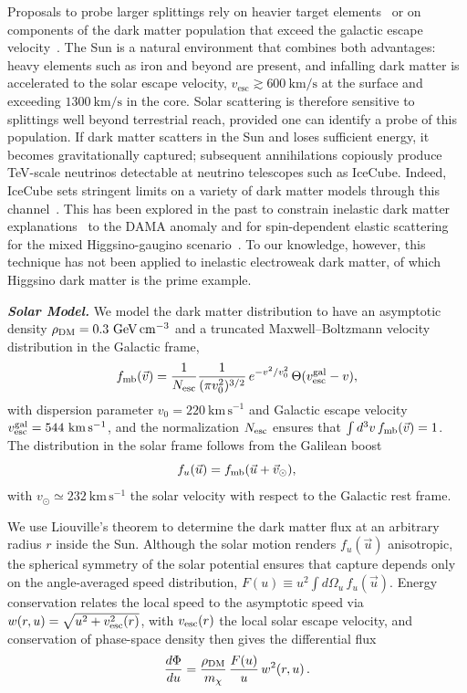 \documentclass[prl,reprint,superscriptaddress]{revtex4-2}
\begin{document}
Proposals to probe larger splittings rely on heavier target elements~\cite{Eby:2019mgs, Graham:2024syw, Graham:2026ivn,Alloni:2026xdf} or on components of the dark matter population that exceed the galactic escape velocity~\cite{Graham:2024syw, Graham:2026ivn}. The Sun is a natural environment that combines both advantages: heavy elements such as iron and beyond are present, and infalling dark matter is accelerated to the solar escape velocity, $v_\mathrm{esc} \gtrsim 600~\mathrm{km/s}$ at the surface and exceeding $1300~\mathrm{km/s}$ in the core. Solar scattering is therefore sensitive to splittings well beyond terrestrial reach, provided one can identify a probe of this population. If dark matter scatters in the Sun and loses sufficient energy, it becomes gravitationally captured; subsequent annihilations copiously produce TeV-scale neutrinos detectable at neutrino telescopes such as IceCube. Indeed, IceCube sets stringent limits on a variety of dark matter models through this channel~\cite{IceCube:2025fcu}. This has been explored in the past to constrain inelastic dark matter explanations~\cite{Nussinov:2009ft,Menon:2009qj,Tucker-Smith:2001myb} to the DAMA anomaly and for spin-dependent elastic scattering for the mixed Higgsino-gaugino scenario~\cite{Krall:2017xij}. To our knowledge, however, this technique has not been applied to inelastic electroweak dark matter, of which Higgsino dark matter is the prime example.

\textit{\textbf{Solar Model.}}
We model the dark matter distribution to have an asymptotic density $\rho_{\rm DM} = 0.3~\mathrm{GeV\,cm^{-3}}$ and a truncated Maxwell--Boltzmann velocity distribution in the Galactic frame,
\begin{equation}
    f_{\rm mb}(\vec{v}) = \frac{1}{N_{\rm esc}} \frac{1}{(\pi v_0^2)^{3/2}} \, e^{-v^2/v_0^2} \, \Theta(v_{\rm esc}^{\rm gal} - v),
\end{equation}
with dispersion parameter $v_0 = 220~\mathrm{km\,s^{-1}}$ and Galactic escape velocity $v_{\rm esc}^{\rm gal} = 544~\mathrm{km\,s^{-1}}$, and the normalization $N_{\rm esc}$ ensures that $\int d^3v\, f_{\rm mb}(\vec{v}) = 1$.
The distribution in the solar frame follows from the Galilean boost
\begin{equation}
    f_u(\vec{u}) = f_{\rm mb}(\vec{u} + \vec{v}_\odot),
\end{equation}
with $v_\odot \simeq 232~\mathrm{km\,s^{-1}}$ the solar velocity with respect to the Galactic rest frame.

We use Liouville's theorem to determine the dark matter flux at an arbitrary radius $r$ inside the Sun. Although the solar motion renders $f_u(\vec{u})$ anisotropic, the spherical symmetry of the solar potential ensures that capture depends only on the angle-averaged speed distribution, $F(u) \equiv u^2 \int d\Omega_u\, f_u(\vec{u})$. Energy conservation relates the local speed to the asymptotic speed via $w(r,u) = \sqrt{u^2 + v_{\rm esc}^2(r)}$, with $v_{\rm esc}(r)$ the local solar escape velocity, and conservation of phase-space density then gives the differential flux
\begin{equation}
    \frac{d\Phi}{du} = \frac{\rho_{\rm DM}}{m_\chi}\, \frac{F(u)}{u}\, w^2(r,u)\,.
\end{equation}
\end{document}

